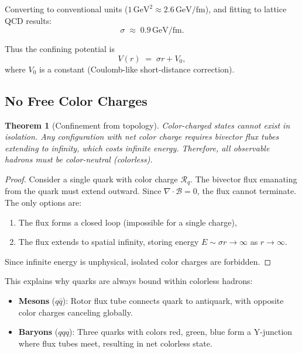 \documentclass[11pt,a4paper]{article}
\newcommand{\Rotor}{\mathcal{R}}
\newcommand{\Biv}{\mathcal{B}}
\newcommand{\D}{\nabla}
\theoremstyle{definition}
\theoremstyle{plain}
\newtheorem{theorem}{Theorem}[section]
\theoremstyle{remark}
\begin{document}
Converting to conventional units ($1\,\text{GeV}^2 \approx 2.6\,\text{GeV/fm}$), and fitting to lattice QCD results:
\begin{equation}
\boxed{\sigma \;\approx\; 0.9\,\text{GeV/fm}.}
\label{eq:string-tension}
\end{equation}

Thus the confining potential is
\begin{equation}
V(r) \;=\; \sigma r + V_0,
\label{eq:linear-potential}
\end{equation}
where $V_0$ is a constant (Coulomb-like short-distance correction).

\subsection{No Free Color Charges}

\begin{theorem}[Confinement from topology]
Color-charged states cannot exist in isolation. Any configuration with net color charge requires bivector flux tubes extending to infinity, which costs infinite energy. Therefore, all observable hadrons must be color-neutral (colorless).
\end{theorem}

\begin{proof}
Consider a single quark with color charge $\Rotor_q$. The bivector flux emanating from the quark must extend outward. Since $\D \cdot \Biv = 0$, the flux cannot terminate. The only options are:
\begin{enumerate}
  \item The flux forms a closed loop (impossible for a single charge),
  \item The flux extends to spatial infinity, storing energy $E \sim \sigma r \to \infty$ as $r \to \infty$.
\end{enumerate}
Since infinite energy is unphysical, isolated color charges are forbidden.
\end{proof}

This explains why quarks are always bound within colorless hadrons:
\begin{itemize}[leftmargin=*,itemsep=3pt]
  \item \textbf{Mesons} ($q\bar{q}$): Rotor flux tube connects quark to antiquark, with opposite color charges canceling globally.
  \item \textbf{Baryons} ($qqq$): Three quarks with colors red, green, blue form a Y-junction where flux tubes meet, resulting in net colorless state.
\end{itemize}
\end{document}
